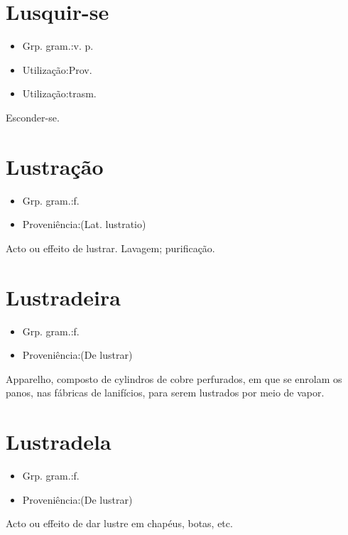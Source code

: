\section{Lusquir-se}
\begin{itemize}
\item {Grp. gram.:v. p.}
\end{itemize}
\begin{itemize}
\item {Utilização:Prov.}
\end{itemize}
\begin{itemize}
\item {Utilização:trasm.}
\end{itemize}
Esconder-se.
\section{Lustração}
\begin{itemize}
\item {Grp. gram.:f.}
\end{itemize}
\begin{itemize}
\item {Proveniência:(Lat. \textunderscore lustratio\textunderscore )}
\end{itemize}
Acto ou effeito de lustrar.
Lavagem; purificação.
\section{Lustradeira}
\begin{itemize}
\item {Grp. gram.:f.}
\end{itemize}
\begin{itemize}
\item {Proveniência:(De \textunderscore lustrar\textunderscore )}
\end{itemize}
Apparelho, composto de cylindros de cobre perfurados, em que se enrolam os panos, nas fábricas de lanifícios, para serem lustrados por meio de vapor.
\section{Lustradela}
\begin{itemize}
\item {Grp. gram.:f.}
\end{itemize}
\begin{itemize}
\item {Proveniência:(De \textunderscore lustrar\textunderscore )}
\end{itemize}
Acto ou effeito de dar lustre em chapéus, botas, etc.
